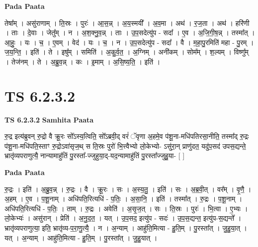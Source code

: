 \documentclass[17pt]{extarticle}
\begin{document}
\textbf{Pada Paata} \newline

तेषा᳚म् । असु॑राणाम् । ति॒स्रः । पुरः॑ । आ॒स॒न्न् । अ॒य॒स्मयी᳚ । अ॒व॒मा । अथ॑ । र॒ज॒ता । अथ॑ । हरि॑णी । ताः । दे॒वाः । जेतु᳚म् । न । अ॒श॒क्नु॒व॒न्न् । ताः । उ॒प॒सदेत्यु॑प - सदा᳚ । ए॒व । अ॒जि॒गी॒ष॒न्न् । तस्मा᳚त् । आ॒हुः॒ । यः । च॒ । ए॒वम् । वेद॑ । यः । च॒ । न । उ॒प॒सदेत्यु॑प - सदा᳚ । वै । म॒हा॒पु॒रमिति॑ महा - पु॒रम् । ज॒य॒न्ति॒ । इति॑ । ते । इषु᳚म् । समिति॑ । अ॒कु॒र्व॒त॒ । अ॒ग्निम् । अनी॑कम् । सोम᳚म् । श॒ल्यम् । विष्णु᳚म् । तेज॑नम् । ते । अ॒ब्रु॒व॒न्न् । कः । इ॒माम् । अ॒सि॒ष्य॒ति॒ । इति॑ ।  \newline





\section{ TS 6.2.3.2 }

\textbf{TS 6.2.3.2 } \newline
\textbf{Samhita Paata} \newline

रु॒द्र इत्य॑ब्रुवन् रु॒द्रो वै क्रू॒रः सो᳚ऽस्य॒त्विति॒ सो᳚ऽब्रवी॒द् वरं॑ ॅवृणा अ॒हमे॒व प॑शू॒ना-मधि॑पतिरसा॒नीति॒ तस्मा᳚द् रु॒द्रः प॑शू॒ना-मधि॑पति॒स्ताꣳ रु॒द्रोऽवा॑सृज॒थ् स ति॒स्रः पुरो॑ भि॒त्त्वैभ्यो लो॒केभ्यो- ऽसु॑रा॒न् प्राणु॑दत॒ यदु॑प॒सद॑ उपस॒द्यन्ते॒ भ्रातृ॑व्यपराणुत्यै॒ नान्यामाहु॑तिं पु॒रस्ता᳚-ज्जुहुया॒द्-यद॒न्यामाहु॑तिं पु॒रस्ता᳚ज्जुहु॒या- [  ] \newline

\textbf{Pada Paata} \newline

रु॒द्रः । इति॑ । अ॒ब्रु॒व॒न्न् । रु॒द्रः । वै । क्रू॒रः । सः । अ॒स्य॒तु॒ । इति॑ । सः । अ॒ब्र॒वी॒त् । वर᳚म् । वृ॒णै॒ । अ॒हम् । ए॒व । प॒शू॒नाम् । अधि॑पति॒रित्यधि॑ - प॒तिः॒ । अ॒सा॒नि॒ । इति॑ । तस्मा᳚त् । रु॒द्रः । प॒शू॒नाम् । अधि॑पति॒रित्यधि॑ - प॒तिः॒ । ताम् । रु॒द्रः । अवेति॑ । अ॒सृ॒ज॒त् । सः । ति॒स्रः । पुरः॑ । भि॒त्वा । ए॒भ्यः । लो॒केभ्यः॑ । असु॑रान् । प्रेति॑ । अ॒नु॒द॒त॒ । यत् । उ॒प॒सद॒ इत्यु॑प - सदः॑ । उ॒प॒स॒द्यन्त॒ इत्यु॑प-स॒द्यन्ते᳚ । भ्रातृ॑व्यपराणुत्या॒ इति॒ भ्रातृ॑व्य-प॒रा॒णु॒त्यै॒ । न । अ॒न्याम् । आहु॑ति॒मित्या - हु॒ति॒म् । पु॒रस्ता᳚त् । जु॒हु॒या॒त् । यत् । अ॒न्याम् । आहु॑ति॒मित्या - हु॒ति॒म् । पु॒रस्ता᳚त् । जु॒हु॒यात् ।  \newline




\end{document}
